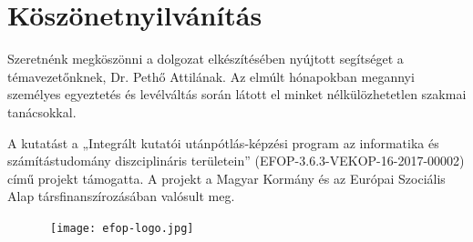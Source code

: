 \chapter*{Köszönetnyilvánítás}

\if{}

Szeretnénk megköszönni a dolgozat elkészítésében nyújtott segítséget a témavezetőnknek, Dr. Pethő Attilának. Az elmúlt hónapokban megannyi személyes egyeztetés és levélváltás során látott el minket nélkülözhetetlen szakmai tanácsokkal.

\hfill\break
\hfill\break

\fi

A kutatást a „Integrált kutatói utánpótlás-képzési program az informatika és számítástudomány diszciplináris területein” (EFOP-3.6.3-VEKOP-16-2017-00002) című projekt támogatta. 
A projekt a Magyar Kormány és az Európai Szociális Alap társfinanszírozásában valósult meg.

\begin{figure}[b]
    \hbox{\hspace{26em} \texttt{[image: efop-logo.jpg]}}
\end{figure}

